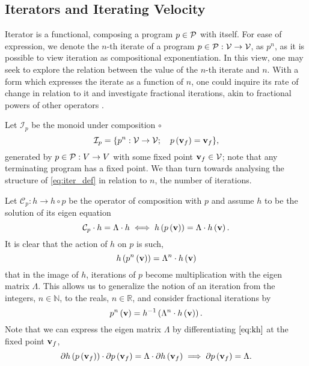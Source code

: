  \subsection{Iterators and Iterating Velocity}
 

  Iterator is a functional, composing a program $p\in\mathcal{P}$ with itself. For ease of expression, we denote the $n$-th iterate of a program $p\in\mathcal{P}:\mathcal{V}\to \mathcal{V}$, as $p^n$, as it is possible to view iteration as compositional exponentiation. In this view, one may seek to explore the relation between the value of the $n$-th iterate and $n$. With a form which expresses the iterate as a function of $n$, one could inquire its rate of change in relation to it and investigate fractional iterations, akin to fractional powers of other operators \cite{komatsu1966fractional}.
  
Let $\mathcal{I}_p$ be the monoid under composition $\circ$ 
  \begin{equation}\label{eq:iter_def}
  \mathcal{I}_p=\{p^n:\mathcal{V}\to \mathcal{V};\quad p\left(\mathbf{v}_f\right)=\mathbf{v}_f\},
  \end{equation}
  generated by $p\in\mathcal{P}:V\to V$ with some fixed point $\mathbf{v}_f\in \mathcal{V}$; note that any terminating program has a fixed point. We than turn towards analysing the structure of \eqref{eq:iter_def} in relation to $n$, the number of iterations.

Let $\mathcal{C}_p:h\to h\circ p$ be the operator of composition with $p$ and assume $h$ to be the solution of its eigen equation
\begin{equation}\label{eq:kh}
 \mathcal{C}_p\cdot h=\Lambda \cdot h\iff h\left(p\left(\mathbf{v}\right)\right)=\Lambda\cdot h\left(\mathbf{v}\right).
  \end{equation}
It is clear that the action of $h$ on $p$ is such, 
  \begin{equation} 
  h\left(p^n\left(\mathbf{v}\right)\right)=\Lambda^n\cdot h\left(\mathbf{v}\right)
  \end{equation}
that in the image of $h$, iterations of $p$ become multiplication with the eigen matrix $\Lambda$. This allows us to generalize the notion of an iteration from the integers, $n\in\mathbb{N}$, to the reals, $n\in\mathbb{R}$, and consider fractional iterations by
\begin{equation}
  p^n\left(\mathbf{v}\right)=h^{-1}\left(\Lambda^n\cdot h\left(\mathbf{v}\right)\right).
\end{equation}
Note that we can express the eigen matrix $\Lambda$ by differentiating $\eqref{eq:kh}$ at the fixed point $\mathbf{v}_f$,
$$\partial h\left(p\left(\mathbf{v}_f\right)\right)\cdot\partial p\left(\mathbf{v}_f\right)=\Lambda\cdot\partial h\left(\mathbf{v}_f\right)\implies\partial p\left(\mathbf{v}_f\right)=\Lambda.$$

